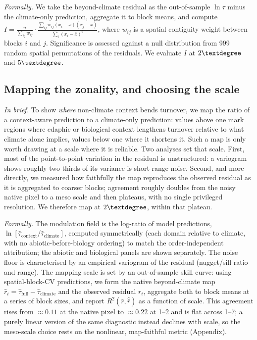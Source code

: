 \textit{Formally.} We take the beyond-climate residual as the out-of-sample
$\ln\tau$ minus the climate-only prediction, aggregate it to block means, and
compute
$I=\frac{n}{\sum_{ij}w_{ij}}\cdot
\frac{\sum_{ij}w_{ij}(x_i-\bar x)(x_j-\bar x)}{\sum_i (x_i-\bar x)^2}$,
where $w_{ij}$ is a spatial contiguity weight between blocks $i$ and $j$.
Significance is assessed against a null distribution from 999 random spatial
permutations of the residuals. We evaluate $I$ at $2\textdegree$ and
$5\textdegree$.

\subsection{Mapping the zonality, and choosing the scale}
\label{sec:mapscale}
\textit{In brief.} To show \emph{where} non-climate context bends turnover, we map
the ratio of a context-aware prediction to a climate-only prediction: values above
one mark regions where edaphic or biological context lengthens turnover relative to
what climate alone implies, values below one where it shortens it. Such a map is
only worth drawing at a scale where it is reliable. Two analyses set that scale.
First, most of the point-to-point variation in the residual is unstructured: a
variogram shows roughly two-thirds of its variance is short-range noise. Second,
and more directly, we measured how faithfully the map reproduces the observed
residual as it is aggregated to coarser blocks; agreement roughly doubles from the
noisy native pixel to a meso scale and then plateaus, with no single privileged
resolution. We therefore map at $2\textdegree$, within that plateau.

\textit{Formally.} The modulation field is the log-ratio of model predictions,
$\ln[\hat\tau_{\text{context}}/\hat\tau_{\text{climate}}]$, computed symmetrically
(each domain relative to climate, with no abiotic-before-biology ordering) to match
the order-independent attribution; the abiotic and biological panels are shown
separately. The noise floor is characterised by an empirical variogram of the
residual (nugget/sill ratio and range). The mapping scale is set by an
out-of-sample skill curve: using spatial-block-CV predictions, we form the native
beyond-climate map $\hat r_i=\hat\tau_{\text{full}}-\hat\tau_{\text{climate}}$ and
the observed residual $r_i$, aggregate both to block means at a series of block
sizes, and report $R^2(\bar r,\hat{\bar r})$ as a function of scale. This agreement
rises from $\approx0.11$ at the native pixel to $\approx0.22$ at
1--2\textdegree{} and is flat across 1--7\textdegree; a purely linear version of the
same diagnostic instead declines with scale, so the meso-scale choice rests on the
nonlinear, map-faithful metric (Appendix).

